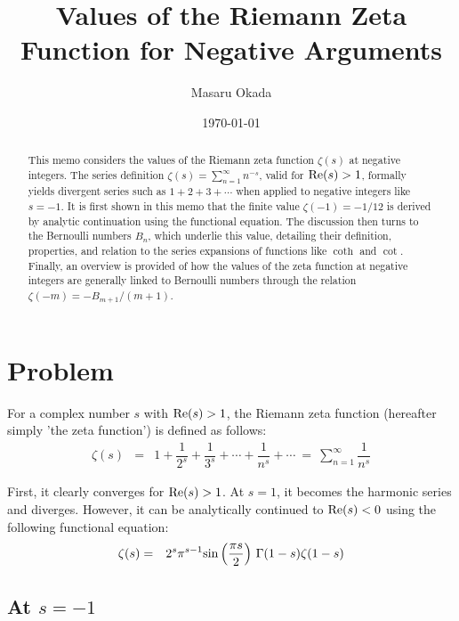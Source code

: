 \documentclass[uplatex,a4j,12pt,dvipdfmx]{jsarticle}
\title{Values of the Riemann Zeta Function for Negative Arguments}
\author{Masaru Okada}
\date{\today}
\begin{document}
\allowdisplaybreaks
\maketitle

\begin{abstract}
	This memo considers the values of the Riemann zeta function $\zeta(s)$ at negative integers.
	The series definition $\zeta(s) = \sum_{n=1}^{\infty} n^{-s}$, valid for ${\rm Re}(s) > 1$, formally yields divergent series such as $1+2+3+\cdots$ when applied to negative integers like $s=-1$.
	It is first shown in this memo that the finite value $\zeta(-1) = -1/12$ is derived by analytic continuation using the functional equation.
	The discussion then turns to the Bernoulli numbers $B_n$, which underlie this value, detailing their definition, properties, and relation to the series expansions of functions like $\coth$ and $\cot$.
	Finally, an overview is provided of how the values of the zeta function at negative integers are generally linked to Bernoulli numbers through the relation $\zeta(-m) = -B_{m+1}/(m+1)$.
\end{abstract}

\tableofcontents

\section{Problem}

For a complex number $s$ with ${\rm Re}(s) > 1$, the
Riemann zeta function (hereafter simply 'the zeta function') is defined as follows:
\begin{eqnarray}
	\zeta(s)
	&=&
	1
	+
	\dfrac{1}{2^{s}}
	+
	\dfrac{1}{3^{s}}
	+
	\cdots
	+
	\dfrac{1}{n^{s}}
	+
	\cdots
	\ = \
	\sum_{n=1}^{\infty}
	\dfrac{1}{n^{s}}
\end{eqnarray}

First, it clearly converges for ${\rm Re}(s) > 1$.
At $s=1$, it becomes the harmonic series and diverges.
However, it can be analytically continued to ${\rm Re}(s) < 0$ using the following functional equation:
\begin{eqnarray}
	\zeta(s)
	&=&
	2^{s}
	\pi^{s-1}
	{\rm sin}
	\left(
	\dfrac{\pi s}{2}
	\right)
	\ \!
	\Gamma(1-s)
	\zeta(1-s)
	\label{eqn:1302112125}
\end{eqnarray}

\subsection{At $s=-1$}
\end{document}
